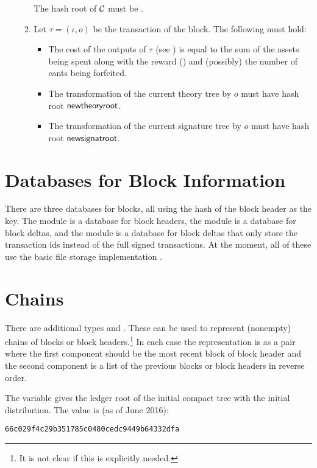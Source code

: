 \begin{itemize}
\begin{enumerate}
The hash root of $\mathcal{C}$ must be {}.
\item Let $\tau=(\iota,o)$ be the transaction of the block. The following must hold:
\begin{itemize}
\item The cost of the outputs of $\tau$ (see {})
is equal to the sum of the assets being spent
along with the reward ({})
and (possibly) the number of cants being forfeited.
\item The transformation of the current theory tree by $o$ must have hash root $\field{newtheoryroot}$.
\item The transformation of the current signature tree by $o$ must have hash root $\field{newsignatroot}$.
\end{itemize}
\end{enumerate}
\end{itemize}

\section{Databases for Block Information}

There are three databases for blocks, all using the hash of the block header as the key.
The module {} is a database for block headers,
the module {} is a database for block deltas,
and the module
{} is a database for block deltas that only store the
transaction ids instead of the full signed transactions.
At the moment, all of these use the basic file storage implementation {}.

\section{Chains}

There are additional types
{}
and 
{}.
These can be used to represent (nonempty) chains of blocks or block headers.\footnote{It is not clear if this is explicitly needed.}
In each case the representation is as a pair
where the first component should be the most recent block of block header
and the second component is a list of the previous blocks or block headers
in reverse order.

The variable {} gives the ledger root of the initial compact tree
with the initial distribution. The value is (as of June 2016):
\begin{verbatim}
66c029f4c29b351785c0480cedc9449b64332dfa
\end{verbatim}

